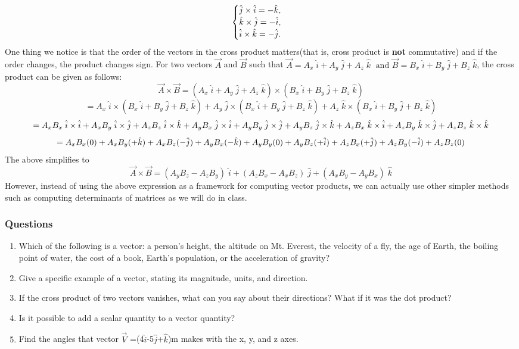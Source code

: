 \documentclass[9pt]{article}
\begin{document}
$$\begin{cases} \hat{j} \times \hat{i} = - \hat{k}, \\ \hat{k} \times \hat{j} = - \hat{i}, \\ \hat{i} \times \hat{k} = - \hat{j} \ldotp \end{cases}$$
One thing we notice is that the order of the vectors in the cross product matters(that is, cross product is \textbf{not} commutative) and if the order changes, the product changes sign. For two vectors $\vec{A}$ and $\vec{B}$ such that $\vec{A} = A_{x}\; \hat{i} + A_{y}\; \hat{j} + A_{z}\; \hat{k}\; \text{ and } \vec{B} = B_{x}\; \hat{i} + B_{y}\; \hat{j} + B_{z}\; \hat{k}$, the cross product can be given as follows:
$$\vec{A} \times \vec{B}  = (A_{x}\; \hat{i} + A_{y}\; \hat{j} + A_{z}\; \hat{k}) \times (B_{x}\; \hat{i} + B_{y}\; \hat{j} + B_{z}\; \hat{k})$$
$$= A_{x}\; \hat{i} \times (B_{x}\; \hat{i} + B_{y}\; \hat{j} + B_{z}\; \hat{k}) + A_{y}\; \hat{j} \times (B_{x}\; \hat{i} + B_{y}\; \hat{j} + B_{z}\; \hat{k}) + A_{z}\; \hat{k} \times (B_{x}\; \hat{i} + B_{y}\; \hat{j} + B_{z}\; \hat{k}) $$
$$ = A_{x}B_{x}\; \hat{i} \times \hat{i} + A_{x}B_{y}\; \hat{i} \times \hat{j} + A_{z}B_{z}\; \hat{i} \times \hat{k} \\  + A_{y}B_{x}\; \hat{j} \times \hat{i} + A_{y}B_{y}\; \hat{j} \times \hat{j} + A_{y}B_{z}\; \hat{j} \times \hat{k} \\  + A_{z}B_{x}\; \hat{k} \times \hat{i} + A_{z}B_{y}\; \hat{k} \times \hat{j} + A_{z}B_{z}\; \hat{k} \times \hat{k} $$
$$= A_{x}B_{x}(0) + A_{x}B_{y}(+\hat{k}) + A_{x}B_{z}(-\hat{j}) \\  + A_{y}B_{x}(-\hat{k}) + A_{y}B_{y}(0) + A_{y}B_{z}(+\hat{i}) \\  + A_{z}B_{x}(+\hat{j}) + A_{z}B_{y}(- \hat{i}) + A_{z}B_{z}(0)$$
The above simplifies to
$$\vec{A} \times \vec{B} = (A_{y}B_{z} - A_{z}B_{y})\; \hat{i} + (A_{z}B_{x} - A_{x}B_{z})\; \hat{j} + (A_{x}B_{y} - A_{y}B_{x})\; \hat{k}$$
However, instead of using the above expression as a framework for computing vector products, we can actually use other simpler methods such as computing determinants of matrices as we will do in class.
\subsubsection*{Questions}
\begin{enumerate}
	\item Which of the following is a vector: a person’s height, the altitude on Mt. Everest, the velocity of a fly, the age of Earth, the boiling point of water, the cost of a book, Earth’s population, or the acceleration of gravity?
	\item Give a specific example of a vector, stating its magnitude, units, and direction.
	\item If the cross product of two vectors vanishes, what can you say about their directions? What if it was the dot product?
	\item Is it possible to add a scalar quantity to a vector quantity?
	\item Find the angles that vector  $\vec{V}$ =(4$\hat{i}$-5$\hat{j}$+$\hat{k}$)m makes with the x, y, and z axes.
\end{enumerate}
\end{document}
